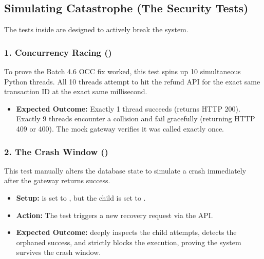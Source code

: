 \vspace{0.8cm}

\subsection{Simulating Catastrophe (The Security Tests)}

The tests inside  are designed to actively break the system.

\subsubsection{1. Concurrency Racing ()}
To prove the Batch 4.6 OCC fix worked, this test spins up 10 simultaneous Python threads. All 10 threads attempt to hit the refund API for the exact same transaction ID at the exact same millisecond. 
\begin{itemize}
    \item \textbf{Expected Outcome:} Exactly 1 thread succeeds (returns HTTP 200). Exactly 9 threads encounter a collision and fail gracefully (returning HTTP 409 or 400). The mock gateway verifies it was called exactly once.
\end{itemize}

\vspace{0.4cm}

\subsubsection{2. The Crash Window ()}
This test manually alters the database state to simulate a crash immediately after the gateway returns success.
\begin{itemize}
    \item \textbf{Setup:}  is set to , but the child  is set to .
    \item \textbf{Action:} The test triggers a new recovery request via the API.
    \item \textbf{Expected Outcome:}  deeply inspects the child attempts, detects the orphaned success, and strictly blocks the execution, proving the system survives the crash window.
\end{itemize}

\vspace{0.4cm}

